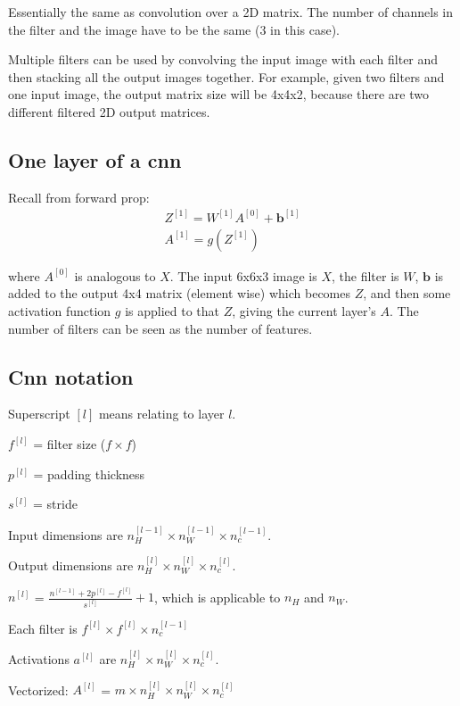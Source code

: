 \documentclass[12pt]{article}
\begin{document}
Essentially the same as convolution over a 2D matrix. The number of channels
in the filter and the image have to be the same (3 in this case).

Multiple filters can be used by convolving the input image with each filter and then stacking
all the output images together. For example, given two filters and one input image,
the output matrix size will be 4x4x2, because there are two different filtered 2D output
matrices.

\subsection{One layer of a cnn}

Recall from forward prop:
\begin{gather*}
    Z^{[1]} = W^{[1]} A^{[0]} + \bm b^{[1]}\\
    A^{[1]} = g(Z^{[1]})
\end{gather*}

where $A^{[0]}$ is analogous to $X$. The input 6x6x3 image is $X$, the filter is $W$,
$\bm b$ is added to the output 4x4 matrix (element wise) which becomes $Z$, and then some
activation function $g$ is applied to that $Z$, giving the current layer's $A$. The number
of filters can be seen as the number of features.

\subsection{Cnn notation}

Superscript $[l]$ means relating to layer $l$.

$f^{[l]}$ = filter size ($f \times f$)

$p^{[l]}$ = padding thickness

$s^{[l]}$ = stride

Input dimensions are $n_H^{[l-1]} \times n_W^{[l-1]} \times n_c^{[l-1]}$.

Output dimensions are $n_H^{[l]} \times n_W^{[l]} \times n_c^{[l]}$.

$n^{[l]}$ = $\frac{n^{[l-1]}+2p^{[l]}-f^{[l]}}{s^{[l]}} + 1$, which is applicable to $n_H$ and $n_W$.

Each filter is $f^{[l]} \times f^{[l]} \times n_c^{[l-1]}$

Activations $a^{[l]}$ are $n_H^{[l]} \times n_W^{[l]} \times n_c^{[l]}$.

Vectorized: $A^{[l]}$ = $m \times n_H^{[l]} \times n_W^{[l]} \times n_c^{[l]}$
\end{document}
